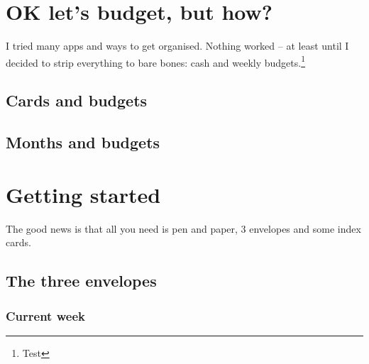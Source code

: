 \section{OK let's budget, but how?}

\begin{figure}
  \centering
\end{figure}

I tried many apps and ways to get organised. Nothing worked – at least until I decided to strip everything to bare bones: cash and weekly budgets.\footnote{Test}

\subsection{Cards and budgets}
\subsection{Months and budgets}

\section{Getting started}

The good news is that all you need is pen and paper, 3 envelopes and some index cards.

\subsection{The three envelopes}

\subsubsection{\color{CurrentWeek} Current week}

